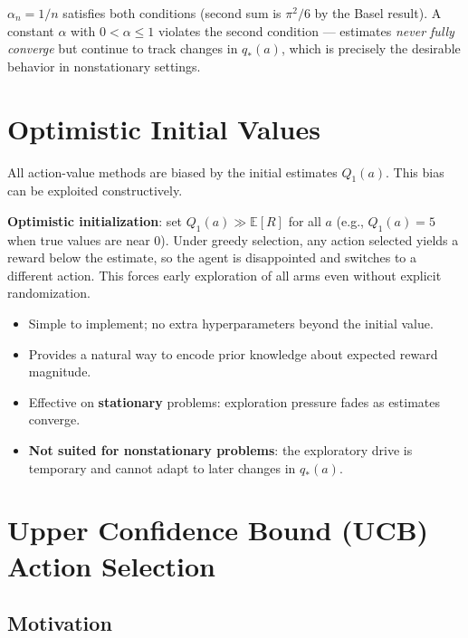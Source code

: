 \documentclass[11pt,a4paper]{article}
\theoremstyle{definition}
\theoremstyle{plain}
\theoremstyle{remark}
\begin{document}
$\alpha_n = 1/n$ satisfies both conditions (second sum is $\pi^2/6$ by the Basel result). A constant $\alpha$ with $0 < \alpha \le 1$ violates the second condition — estimates \emph{never fully converge} but continue to track changes in $q_*(a)$, which is precisely the desirable behavior in nonstationary settings.

\section{Optimistic Initial Values}

All action-value methods are biased by the initial estimates $Q_1(a)$. This bias can be exploited constructively.

\textbf{Optimistic initialization}: set $Q_1(a) \gg \mathbb{E}[R]$ for all $a$ (e.g., $Q_1(a) = 5$ when true values are near 0). Under greedy selection, any action selected yields a reward below the estimate, so the agent is disappointed and switches to a different action. This forces early exploration of all arms even without explicit randomization.

\begin{tcolorbox}[colback=blue!5!white,colframe=blue!75!black,title=\textbf{Properties of Optimistic Initialization}]
\begin{itemize}
    \item Simple to implement; no extra hyperparameters beyond the initial value.
    \item Provides a natural way to encode prior knowledge about expected reward magnitude.
    \item Effective on \textbf{stationary} problems: exploration pressure fades as estimates converge.
    \item \textbf{Not suited for nonstationary problems}: the exploratory drive is temporary and cannot adapt to later changes in $q_*(a)$.
\end{itemize}
\end{tcolorbox}

\section{Upper Confidence Bound (UCB) Action Selection}

\subsection{Motivation}
\end{document}
